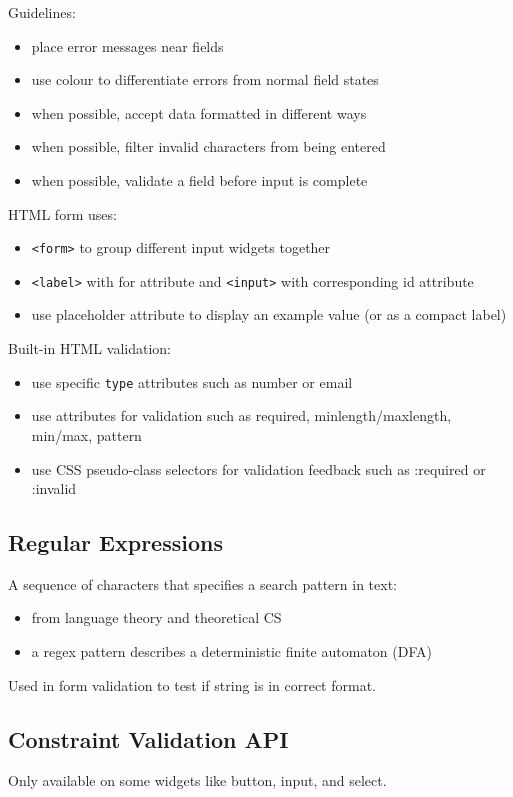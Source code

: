 \documentclass[11pt]{article}
\begin{document}
Guidelines:
\begin{itemize}
\item place error messages near fields
\item use colour to differentiate errors from normal field states
\item when possible, accept data formatted in different ways
\item when possible, filter invalid characters from being entered
\item when possible, validate a field before input is complete
\end{itemize}

HTML form uses:
\begin{itemize}
\item \texttt{<form>} to group different input widgets together
\item \texttt{<label>} with for attribute and \texttt{<input>} with corresponding id attribute
\item use placeholder attribute to display an example value (or as a compact label)
\end{itemize}

Built-in HTML validation:
\begin{itemize}
\item use specific \texttt{type} attributes such as number or email
\item use attributes for validation such as required, minlength/maxlength, min/max, pattern
\item use CSS pseudo-class selectors for validation feedback such as :required or :invalid
\end{itemize}
\subsection{Regular Expressions}
\label{sec:orgc4b729f}
A sequence of characters that specifies a search pattern in text:
\begin{itemize}
\item from language theory and theoretical CS
\item a regex pattern describes a deterministic finite automaton (DFA)
\end{itemize}

Used in form validation to test if string is in correct format.
\subsection{Constraint Validation API}
\label{sec:org721a3bd}
Only available on some widgets like button, input, and select.
\end{document}
